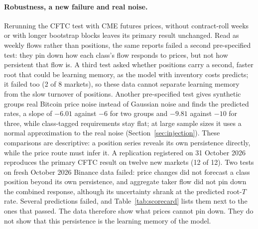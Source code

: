 \documentclass[12pt]{article}
\theoremstyle{definition}
\theoremstyle{remark}
\begin{document}
\paragraph{Robustness, a new failure and real noise.} Rerunning the CFTC test with CME futures prices, without contract-roll weeks or with longer bootstrap blocks leaves its primary result unchanged. Read as weekly flows rather than positions, the same reports failed a second pre-specified test: they pin down how each class's flow responds to prices, but not how persistent that flow is. A third test asked whether positions carry a second, faster root that could be learning memory, as the model with inventory costs predicts; it failed too (2 of 8 markets), so these data cannot separate learning memory from the slow turnover of positions. Another pre-specified test gives synthetic groups real Bitcoin price noise instead of Gaussian noise and finds the predicted rates, a slope of $-6.01$ against $-6$ for two groups and $-9.81$ against $-10$ for three, while class-tagged requirements stay flat; at large sample sizes it uses a normal approximation to the real noise (Section~\ref{sec:injection}). These comparisons are descriptive: a position series reveals its own persistence directly, while the price route must infer it. A replication registered on 31 October 2026 reproduces the primary CFTC result on twelve new markets (12 of 12). Two tests on fresh October 2026 Binance data failed: price changes did not forecast a class position beyond its own persistence, and aggregate taker flow did not pin down the combined response, although its uncertainty shrank at the predicted root-$T$ rate. Several predictions failed, and Table~\ref{tab:scorecard} lists them next to the ones that passed. The data therefore show what prices cannot pin down. They do not show that this persistence is the learning memory of the model.
\end{document}
